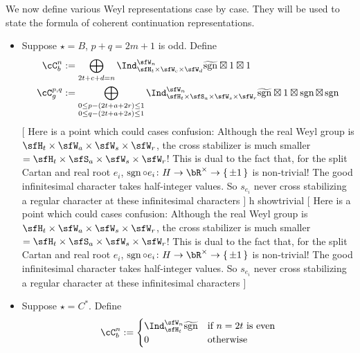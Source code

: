 \documentclass[12pt,a4paper]{amsart}
\newcommand{\trivial}[2][]{\if\relax\detokenize{#1}\relax
  {%
      \color{orange} \vspace{0em} $[$  #2 $]$
      \color{black}
  }
  \else
\ifx#1h
\ifcsname showtrivial\endcsname
{%
    \color{orange} \vspace{0em}  $[$ #2 $]$
    \color{black}
}
\fi
\else {\red Wrong argument!} \fi
\fi
}
\newcommand{\Res}{\mathrm{Res}}
\newcommand{\sgn}{\operatorname{sgn}}
\numberwithin{equation}{section}
\theoremstyle{remark}
\def\brsgn{\breve{\sgn}}
\def\hsgn{\widetilde{\mathrm{sgn}}}
\begin{document}
We now define various Weyl representations case by case. They will be used to
state the formula of coherent continuation representations.
\begin{itemize}
  \item Suppose $\star= B$, $p+q=2m+1$ is odd. Define
        \[
        \begin{split}
          \cC_b^{n} & :=\bigoplus_{\substack{2t+c+d=n}} \Ind_{\sfH_{t} \times \sfW_{c}\times \sfW_{d}}^{\sfW_{n}}
          \hsgn\boxtimes 1\boxtimes 1 \\
          \cC_g^{p,q} &:=\bigoplus_{\substack{0\leq p-(2t+a+2r)\leq 1\\0\leq q - (2t+a+2s)\leq 1}} \Ind_{\sfH_{t} \times \sfS_{a}\times \sfW_s\times \sfW_r}^{\sfW_{n}}
          \hsgn \boxtimes 1 \boxtimes \sgn \boxtimes \sgn \\
        \end{split}
        \]
        \trivial[]{ Here is a point which could cases confusion: Although the
        real Weyl group is
        $\sfH_{t}\times \sfW_{a}\times \sfW_{s}\times \sfW_{r}$, the cross
        stabilizer is much smaller
        $=\sfH_{t}\times \sfS_{a}\times \sfW_{s}\times \sfW_{r}$! This is dual
        to the fact that, for the split Cartan and real root $e_{i}$,
        $\sgn\circ e_{i}\colon H\rightarrow \bR^{\times}\rightarrow \set{\pm 1}$
        is non-trivial! The good infinitesimal character takes half-integer
        values. So $s_{e_{i}}$ never cross stabilizing a regular character at
        these infinitesimal characters }
  \item Suppose $\star=C^{*}$. Define
        \[
        \begin{split}
          \cC_b^{n} & :=
          \begin{cases}
            \Ind_{\sfH_{t}}^{\sfW_{n}} \hsgn &
            \text{if $n=2t$ is even} \\
            0 & \text{otherwise}\\
          \end{cases}\\

\end{split}\]
\end{itemize}
\end{document}
